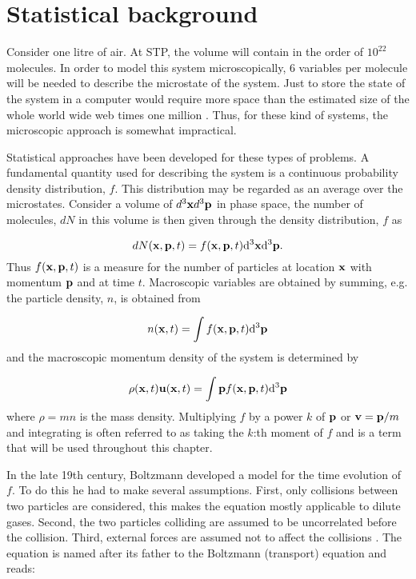 \section{Statistical background}\label{sec:lbm:stat}
Consider one litre of air. At STP, the volume will contain in the
order of $10^{22}$ molecules. In order to model this system
microscopically, 6 variables per molecule will be needed to describe
the microstate of the system. Just to store the state of the system in
a computer would require more space than the estimated size of the
whole world wide web times one million \cite{wolfram-alpha-web}. Thus,
for these kind of systems, the microscopic approach is somewhat
impractical.


Statistical approaches have been developed for these types of
problems. A fundamental quantity used for describing the system is a
continuous probability density distribution, $f$. This distribution
may be regarded as an average over the microstates. Consider a volume
of $d^3\mathbf{x} d^3\mathbf{p}$ in phase space, the number of molecules, $dN$
in this volume is then given through the density distribution, $f$ as

\begin{equation}
dN(\mathbf{x}, \mathbf{p}, t) = f(\mathbf{x}, \mathbf{p}, t)\mathrm{d}^3\mathbf{x} \mathrm{d}^3\mathbf{p}.
\end{equation}
Thus $f(\mathbf{x}, \mathbf{p}, t)$ is a measure for the number of particles at
location $\mathbf{x}$ with momentum $\mathbf{p}$ and at time $t$. Macroscopic variables are
obtained by summing, e.g. the particle density, $n$, is obtained from

\begin{equation}
n(\mathbf{x}, t) = \int f(\mathbf{x}, \mathbf{p}, t) \mathrm{d}^3\mathbf{p}
\end{equation}
and the macroscopic momentum density of the system is determined by

\begin{equation}
\rho(\mathbf{x}, t) \mathbf{u}(\mathbf{x}, t) = \int \mathbf{p} f(\mathbf{x}, \mathbf{p}, t) \mathrm{d}^3\mathbf{p}
\end{equation}
where $\rho = m n$ is the mass density. Multiplying $f$ by a power $k$ of
$\mathbf{p}$ or $\mathbf{v} = \mathbf{p}/m$ and integrating is often referred to as
taking the $k$:th moment of $f$ and is a term that will be used
throughout this chapter.

In the late 19th century, Boltzmann developed a model for the time
evolution of $f$. To do this he had to make several
assumptions. First, only collisions between two particles are
considered, this makes the equation mostly applicable to dilute
gases. Second, the two particles colliding are assumed to be
uncorrelated before the collision. Third, external forces are assumed
not to affect the collisions \cite{wolf-gladrow}. The equation is
named after its father to the Boltzmann (transport) equation and
reads:

